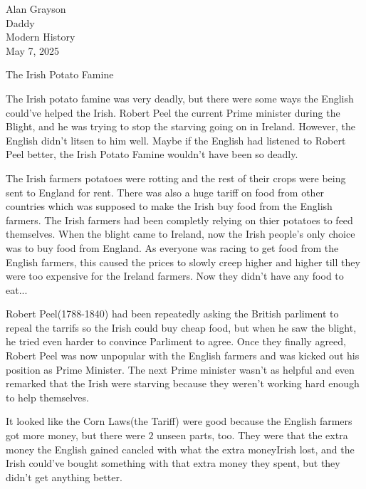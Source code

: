 \documentclass[12pt]{article}
\begin{document}
\begin{flushleft}

Alan Grayson\\
Daddy\\
Modern History\\
May 7, 2025\\


\begin{center}
The Irish Potato Famine
\end{center}

\setlength{\parindent}{0.5in}

The Irish potato famine was very deadly, but there were some ways the
English could've helped the Irish.  Robert Peel the current Prime minister during the Blight, and he was
trying to stop the starving going on in Ireland. However, the English
didn't litsen to him well. Maybe if the English had listened to Robert Peel
better, the Irish Potato Famine wouldn't have been so deadly.


The Irish farmers potatoes were rotting and the rest of their crops
were being sent to England for rent. There was also a huge tariff on
food from other countries which was supposed to make the Irish buy
food from the English farmers. The Irish farmers had been completly
relying on thier potatoes to feed themselves. When the blight came to
Ireland, now the Irish people's only choice was to buy food from
England. As everyone was racing to get food from the English farmers,
this caused the prices to slowly creep higher and higher till they
were too expensive for the Ireland farmers. Now they didn't have any
food to eat...



Robert Peel(1788-1840) had been repeatedly asking the British
parliment to repeal the tarrifs so the Irish could buy cheap food, but
when he saw the blight, he tried even harder to convince Parliment to
agree.  Once they finally agreed, Robert Peel was now unpopular with
the English farmers and was kicked out his position as Prime
Minister. The next Prime minister wasn't as helpful and even remarked
that the Irish were starving because they weren't working hard enough
to help themselves.



It looked like the Corn Laws(the Tariff) were good because the English farmers got
more money, but there were $2$ unseen parts, too. They were that the
extra money the English gained cancled with what the extra moneyIrish lost, and the
Irish could've bought something with that extra money they spent, but
they didn't get anything better.


\end{flushleft}
\end{document}
